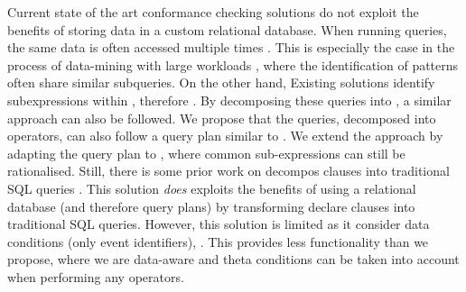 Current state of the art conformance checking solutions do not exploit the benefits of storing data in a custom relational database. When running queries, the same data is often accessed multiple times \cite{BurattinMS16,bpm21}. This is especially the case in the process of data-mining with large workloads \cite{SchonigRCJM16}, where the identification of patterns often share similar subqueries. On the other hand, Existing solutions  \cite{BellatrecheKB21} identify  sub\RevAdd{-}expressions within , therefore  . By decomposing these queries into \LTLf, a similar approach can also be followed. We propose that the queries, decomposed into \LTLf operators, can also follow a query plan similar to \cite{BellatrecheKB21}. We extend the approach by adapting the query plan to , where common sub-expressions can still be rationalised. Still, there is some prior work on  decompos clauses into traditional SQL queries \cite{SchonigRCJM16}. This solution \emph{does} exploits the benefits of using a relational database (and therefore query plans) by transforming declare clauses into traditional SQL queries. However, this solution is limited as it  consider data conditions (only event identifiers), . This provides less functionality than we propose, where we are data-aware and theta conditions can be taken into account when performing any operators.



